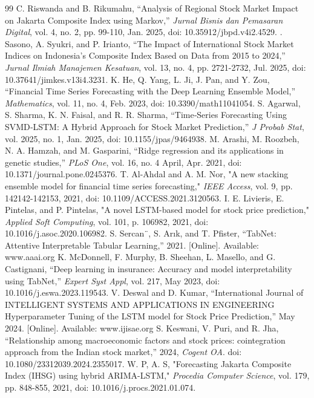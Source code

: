\documentclass[conference]{IEEEtran}
\begin{document}
\begin{thebibliography}{99}
   C. Riswanda and B. Rikumahu, “Analysis of Regional Stock Market Impact on Jakarta Composite Index using Markov,” \textit{Jurnal Bisnis dan Pemasaran Digital}, vol. 4, no. 2, pp. 99-110, Jan. 2025, doi: 10.35912/jbpd.v4i2.4529.
   . Sasono, A. Syukri, and P. Irianto, “The Impact of International Stock Market Indices on Indonesia’s Composite Index Based on Data from 2015 to 2024,” \textit{Jurnal Ilmiah Manajemen Kesatuan}, vol. 13, no. 4, pp. 2721-2732, Jul. 2025, doi: 10.37641/jimkes.v13i4.3231.
   K. He, Q. Yang, L. Ji, J. Pan, and Y. Zou, “Financial Time Series Forecasting with the Deep Learning Ensemble Model,” \textit{Mathematics}, vol. 11, no. 4, Feb. 2023, doi: 10.3390/math11041054.
   S. Agarwal, S. Sharma, K. N. Faisal, and R. R. Sharma, “Time‐Series Forecasting Using SVMD‐LSTM: A Hybrid Approach for Stock Market Prediction,” \textit{J Probab Stat}, vol. 2025, no. 1, Jan. 2025, doi: 10.1155/jpas/9464938.
   M. Arashi, M. Roozbeh, N. A. Hamzah, and M. Gasparini, “Ridge regression and its applications in genetic studies,” \textit{PLoS One}, vol. 16, no. 4 April, Apr. 2021, doi: 10.1371/journal.pone.0245376.
   T. Al-Ahdal and A. M. Nor, "A new stacking ensemble model for financial time series forecasting," \textit{IEEE Access}, vol. 9, pp. 142142-142153, 2021, doi: 10.1109/ACCESS.2021.3120563.
   I. E. Livieris, E. Pintelas, and P. Pintelas, "A novel LSTM-based model for stock price prediction," \textit{Applied Soft Computing}, vol. 101, p. 106982, 2021, doi: 10.1016/j.asoc.2020.106982.
   S. Sercan¨, S. Arık, and T. Pfister, “TabNet: Attentive Interpretable Tabular Learning,” 2021. [Online]. Available: www.aaai.org
   K. McDonnell, F. Murphy, B. Sheehan, L. Masello, and G. Castignani, “Deep learning in insurance: Accuracy and model interpretability using TabNet,” \textit{Expert Syst Appl}, vol. 217, May 2023, doi: 10.1016/j.eswa.2023.119543.
   V. Deswal and D. Kumar, “International Journal of INTELLIGENT SYSTEMS AND APPLICATIONS IN ENGINEERING Hyperparameter Tuning of the LSTM model for Stock Price Prediction,” May 2024. [Online]. Available: www.ijisae.org
   S. Keswani, V. Puri, and R. Jha, “Relationship among macroeconomic factors and stock prices: cointegration approach from the Indian stock market,” 2024, \textit{Cogent OA}. doi: 10.1080/23312039.2024.2355017.
   W. P, A. S, "Forecasting Jakarta Composite Index (IHSG) using hybrid ARIMA-LSTM," \textit{Procedia Computer Science}, vol. 179, pp. 848-855, 2021, doi: 10.1016/j.procs.2021.01.074.

\end{thebibliography}
\end{document}

